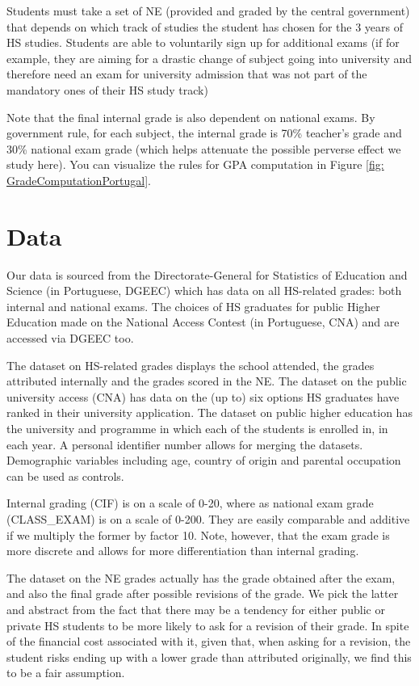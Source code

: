 \documentclass{article}
\begin{document}
Students must take a set of NE (provided and graded by the central government) that depends on which track of studies the student has chosen for the 3 years of HS studies. Students are able to voluntarily sign up for additional exams (if for example, they are aiming for a drastic change of subject going into university and therefore need an exam for university admission that was not part of the mandatory ones of their HS study track)

Note that the final internal grade is also dependent on national exams. By government rule, for each subject, the internal grade is 70\% teacher's grade and 30\% national exam grade (which helps attenuate the possible perverse effect we study here). You can visualize the rules for GPA computation in Figure \ref{fig: GradeComputationPortugal}.

\section{Data}
Our data is sourced from the Directorate-General for Statistics of Education and Science (in Portuguese, DGEEC) which has data on all HS-related grades: both internal and national exams. The choices of HS graduates for public Higher Education made on the National Access Contest (in Portuguese, CNA) and are accessed via DGEEC too.

The dataset on HS-related grades displays the school attended, the grades attributed internally and the grades scored in the NE.
The dataset on the public university access (CNA) has data on the (up to) six options HS graduates have ranked in their university application. 
The dataset on public higher education has the university and programme in which each of the students is enrolled in, in each year.
A personal identifier number allows for merging the datasets. 
Demographic variables including age, country of origin and parental occupation can be used as controls.

Internal grading (CIF) is on a scale of 0-20, where as national exam grade (CLASS\_EXAM) is on a scale of 0-200. They are easily comparable and additive if we multiply the former by factor 10. Note, however, that the exam grade is more discrete and allows for more differentiation than internal grading. 

The dataset on the NE grades actually has the grade obtained after the exam, and also the final grade after possible revisions of the grade. We pick the latter and abstract from the fact that there may be a tendency for either public or private HS students to be more likely to ask for a revision of their grade. In spite of the financial cost associated with it, given that, when asking for a revision, the student risks ending up with a lower grade than attributed originally, we find this to be a fair assumption.
\end{document}
